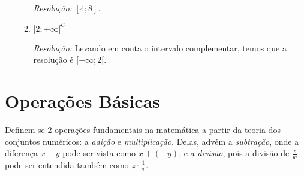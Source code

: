 \documentclass[13pt,letterpaper]{article}
\begin{document}
\begin{enumerate}
\begin{enumerate}

        \emph{Resolução:} $[4; 8]$. \\

        \item ${[2; +\infty[}^C$\\
        
        \emph{Resolução:} Levando em conta o intervalo complementar, temos que a resolução é $[-\infty; 2[$. \\
    \end{enumerate}
\end{enumerate}
\newpage

\section{Operações Básicas}
Definem-se 2 operações fundamentais na matemática a partir da teoria dos conjuntos numéricos: a \emph{adição} e \emph{multiplicação}. Delas, advém a \emph{subtração}, onde a diferença $x - y$ pode ser vista como $x + (-y)$, e a \emph{divisão}, pois a divisão de $\frac{z}{w}$ pode ser entendida também como $z \cdot \frac{1}{w}$.
\end{document}
